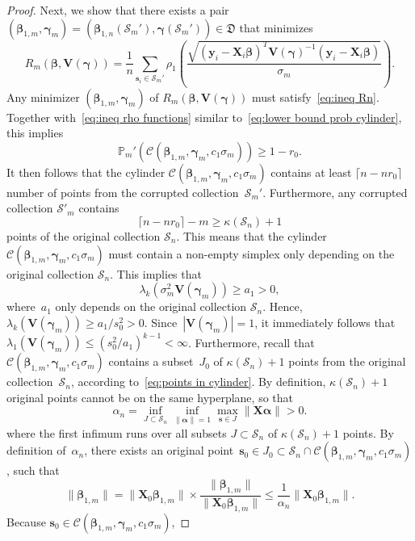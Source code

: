 \documentclass{article}
\numberwithin{equation}{section}
\theoremstyle{plain}
\newcommand{\bbeta}{\bm\beta}
\newcommand{\balpha}{\bm\alpha}
\newcommand{\bgamma}{\bm\gamma}
\newcommand{\by}{\mathbf{y}}
\newcommand{\bs}{\mathbf{s}}
\newcommand{\bX}{\mathbf{X}}
\newcommand{\bV}{\mathbf{V}}
\begin{document}
\begin{proof}
Next, we show that there exists a pair
$(\bbeta_{1,m},\bgamma_m)=(\bbeta_{1,n}(\mathcal{S}_m'),\bgamma(\mathcal{S}_m'))\in \mathfrak{D}$ 
that minimizes
\[
R_m(\bbeta,\bV(\bgamma))
=
\frac1n
\sum_{\bs_i\in \mathcal{S}_m'}
\rho_1\left(
\frac{\displaystyle\sqrt{(\by_i-\bX_i\bbeta)^T\bV(\bgamma)^{-1}(\by_i-\bX_i\bbeta)}}{\sigma_m}
\right).
\]
Any minimizer $(\bbeta_{1,m},\bgamma_m)$ of $R_m(\bbeta,\bV(\bgamma))$ must satisfy~\eqref{eq:ineq Rn}.
Together with~\eqref{eq:ineq rho functions}
similar to~\eqref{eq:lower bound prob cylinder}, this implies
\[
\mathbb{P}_m'\left(\mathcal{C}(\bbeta_{1,m},\bgamma_m,c_1\sigma_m)\right)
\geq 
1-r_0.
\]
It then follows that the cylinder $\mathcal{C}(\bbeta_{1,m},\bgamma_m,c_1\sigma_m)$
contains at least $\lceil n-nr_0\rceil$ number of points from the corrupted collection~$\mathcal{S}_m'$.
Furthermore, any corrupted collection $\mathcal{S}'_m$ contains
\begin{equation}
\label{eq:points in cylinder}
\lceil n-nr_0\rceil-m
\geq
\kappa(\mathcal{S}_n)+1
\end{equation}
points of the original collection $\mathcal{S}_n$.
This means that the cylinder $\mathcal{C}(\bbeta_{1,m},\bgamma_m,c_1\sigma_m)$
must contain a non-empty simplex only depending on the original collection $\mathcal{S}_n$.
This implies that
\begin{equation}
\label{eq:lwb lamdak}
\lambda_k(\sigma_m^2\bV(\bgamma_m))\geq a_1>0,
\end{equation}
where~$a_1$ only depends on the original collection $\mathcal{S}_n$.
Hence,
$\lambda_k(\bV(\bgamma_m))\geq a_1/s_0^2>0$.
Since~$|\bV(\bgamma_m)|=1$, it immediately follows that
$\lambda_1(\bV(\bgamma_m))\leq (s_0^2/a_1)^{k-1}<\infty$.
Furthermore, recall that
$\mathcal{C}(\bbeta_{1,m},\bgamma_m,c_1\sigma_m)$ contains a subset~$J_0$ of
$\kappa(\mathcal{S}_n)+1$ points from the original collection~$\mathcal{S}_n$,
according to~\eqref{eq:points in cylinder}.
By definition, $\kappa(\mathcal{S}_n)+1$ original points cannot be on the same hyperplane, so that
\[
\alpha_n
=
\inf_{J\subset \mathcal{S}_n}
\inf_{\|\balpha\|=1}\max_{\bs\in J}
\|\bX\balpha\|>0.
\]
where the first infimum runs over all subsets $J\subset \mathcal{S}_n$ of $\kappa(\mathcal{S}_n)+1$ points.
By definition of~$\alpha_n$,
there exists an original point~$\bs_0\in J_0\subset \mathcal{S}_n\cap
\mathcal{C}(\bbeta_{1,m},\bgamma_m,c_1\sigma_m)$, such that
\[
\|\bbeta_{1,m}\|
=
\|\bX_0\bbeta_{1,m}\|
\times
\frac{\|\bbeta_{1,m}\|}{\|\bX_0\bbeta_{1,m}\|}
\leq
\frac{1}{\alpha_n}
\|\bX_0\bbeta_{1,m}\|.
\]
Because $\bs_0\in \mathcal{C}(\bbeta_{1,m},\bgamma_m,c_1\sigma_m)$,

\end{proof}
\end{document}
